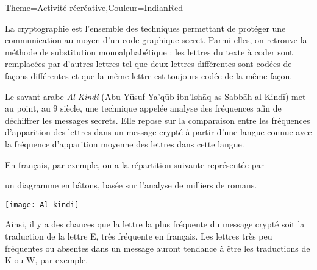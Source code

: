 \begin{Maquette}[Cours]{Theme={Activité récréative},Couleur={IndianRed}}
    

      La cryptographie est l'ensemble des techniques permettant de protéger une communication au moyen d'un code graphique secret. Parmi elles, on retrouve la méthode de substitution monoalphabétique : les lettres du texte à coder sont remplacées par d’autres lettres tel que  deux lettres différentes sont codées de façons différentes et que la même lettre est toujours codée de la même façon. \par
      \begin{minipage}{12cm}
         Le savant arabe {\it Al-Kindi}  (Abu Yūsuf Ya'qūb ibn'Ishāq as-Sabbāh al-Kindī) met au point, au 9 siècle, une technique appelée analyse des fréquences afin de déchiffrer les messages secrets. Elle repose sur la comparaison entre les fréquences d'apparition des lettres dans un message crypté à partir d'une langue connue avec la fréquence d'apparition moyenne des lettres dans cette langue. \par
         En français, par exemple, on a la répartition suivante représentée par \par
         un diagramme en bâtons, basée sur l'analyse de milliers de romans. 
      \end{minipage}
      \hfill
      \begin{minipage}{4cm}
         \texttt{[image: Al-kindi]}
      \end{minipage}
      \begin{center}
         {\footnotesize
          }
      \end{center}  
      Ainsi, il y a des chances que la lettre la plus fréquente du message crypté soit la traduction de la lettre E, très fréquente en français. Les lettres très peu fréquentes ou absentes dans un message auront tendance à être les traductions de K ou W, par exemple. \par \bigskip


\end{Maquette}

